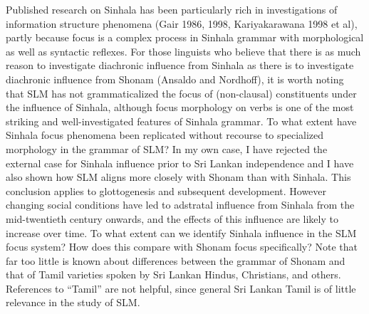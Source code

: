 Published research on Sinhala has been particularly rich in investigations of information structure phenomena (Gair 1986, 1998, Kariyakarawana 1998 et al), partly because focus is a complex process in Sinhala grammar with morphological as well as syntactic reflexes. For those linguists who believe that there is as much reason to investigate diachronic influence from Sinhala as there is to investigate diachronic influence from Shonam (Ansaldo and Nordhoff), it is worth noting that SLM has not grammaticalized the focus of (non-clausal) constituents under the influence of Sinhala, although focus morphology on verbs is one of the most striking and well-investigated features of Sinhala grammar. To what extent have Sinhala focus phenomena been replicated without recourse to specialized morphology in the grammar of SLM? In my own case, I have rejected the external case for Sinhala influence prior to Sri Lankan independence and I have also shown how SLM aligns more closely with Shonam than with Sinhala. This conclusion applies to glottogenesis and subsequent development. However changing social conditions have led to adstratal influence from Sinhala from the mid-twentieth century onwards, and the effects of this influence are likely to increase over time. To what extent can we identify Sinhala influence in the SLM focus system? How does this compare with Shonam focus specifically? Note that far too little is known about differences between the grammar of Shonam and that of Tamil varieties spoken by Sri Lankan Hindus, Christians, and others. References to ``Tamil'' are not helpful, since general Sri Lankan Tamil is of little relevance in the study of SLM.
